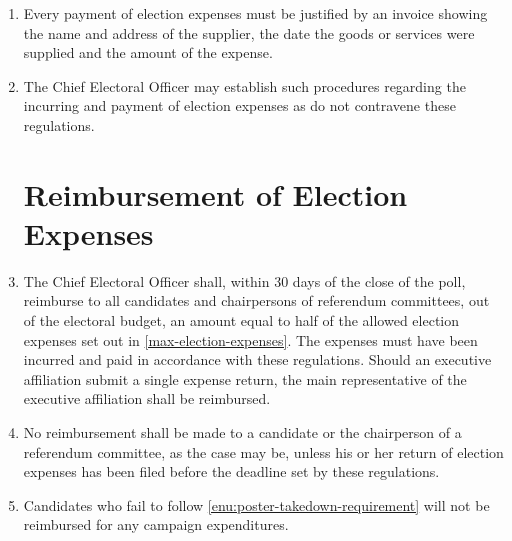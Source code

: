 \documentclass[oneside]{book}
\begin{document}
\begin{enumerate}
\item Every payment of election expenses must be justified by an invoice
showing the name and address of the supplier, the date the goods or
services were supplied and the amount of the expense. 
\item The Chief Electoral Officer may establish such procedures regarding
the incurring and payment of election expenses as do not contravene
these regulations. 

\section{\label{Reimbursement_of_Election_Expenses}Reimbursement of Election
Expenses }
\item The Chief Electoral Officer shall, within 30 days of the close of
the poll, reimburse to all candidates and chairpersons of referendum
committees, out of the electoral budget, an amount equal to half of
the allowed election expenses set out in \autoref{max-election-expenses}.
The expenses must have been incurred and paid in accordance with these
regulations. Should an executive affiliation submit a single expense
return, the main representative of the executive affiliation shall
be reimbursed. 
\item No reimbursement shall be made to a candidate or the chairperson of
a referendum committee, as the case may be, unless his or her return
of election expenses has been filed before the deadline set by these
regulations. 
\item Candidates who fail to follow \autoref{enu:poster-takedown-requirement}
will not be reimbursed for any campaign expenditures. 


\end{enumerate}
\end{document}
